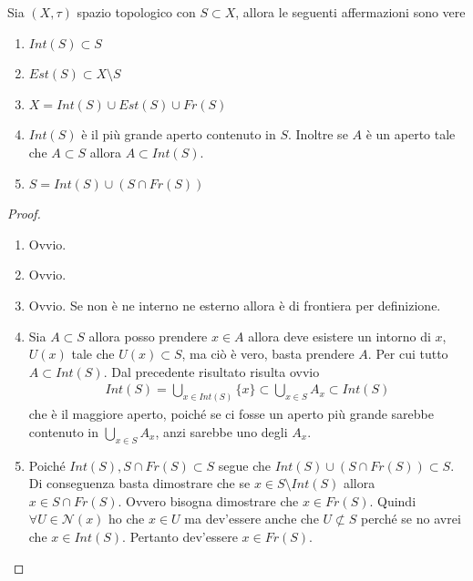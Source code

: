 \begin{proposition}
	Sia $(X,\tau)$ spazio topologico con $S \subset X$, allora le seguenti affermazioni sono vere
	\begin{enumerate}
		\item $Int(S) \subset S$
		\item $Est(S) \subset X \setminus S$
		\item $X = Int(S) \cup Est(S) \cup Fr(S)$ 
		\item $Int(S)$ è il più grande aperto contenuto in $S$. Inoltre se $A$ è un aperto tale che $A \subset S$ allora $A \subset Int(S)$.	
		\item $S = Int(S) \cup (S \cap Fr(S))$ \label{thr:set_decomposition_inner_frontier}
	\end{enumerate}
\end{proposition}
\begin{proof}
	\begin{enumerate}
		\item Ovvio.
		\item Ovvio.
		\item Ovvio. Se non è ne interno ne esterno allora è di frontiera per definizione.
		\item Sia $A \subset S$ allora posso prendere $x \in A$ allora deve esistere un intorno di $x$, $U(x)$ tale che $U(x) \subset S$, ma ciò è vero, basta prendere $A$. Per cui tutto $A \subset Int(S)$. Dal precedente risultato risulta ovvio
		\begin{equation}
		\begin{aligned}
			Int(S) = \bigcup_{x\in Int(S)} \{x\} \subset \bigcup_{x \in S} A_x \subset Int(S) 
		\end{aligned}
		\end{equation}
		che è il maggiore aperto, poiché se ci fosse un aperto più grande sarebbe contenuto in $\bigcup_{x \in S} A_x$, anzi sarebbe uno degli $A_x$.
		\item Poiché $Int(S), S \cap Fr(S) \subset S$ segue che $Int(S) \cup (S \cap Fr(S)) \subset S$. Di conseguenza basta dimostrare che se $x \in S \setminus Int(S)$ allora $x \in S \cap Fr(S)$. Ovvero bisogna dimostrare che $x \in Fr(S)$. Quindi $\forall U \in \mathcal{N}(x)$ ho che $x \in U$ ma dev'essere anche che $U \not \subset S$ perché se no avrei che $x \in Int(S)$. Pertanto dev'essere $x \in Fr(S)$.
	\end{enumerate}
\end{proof}

